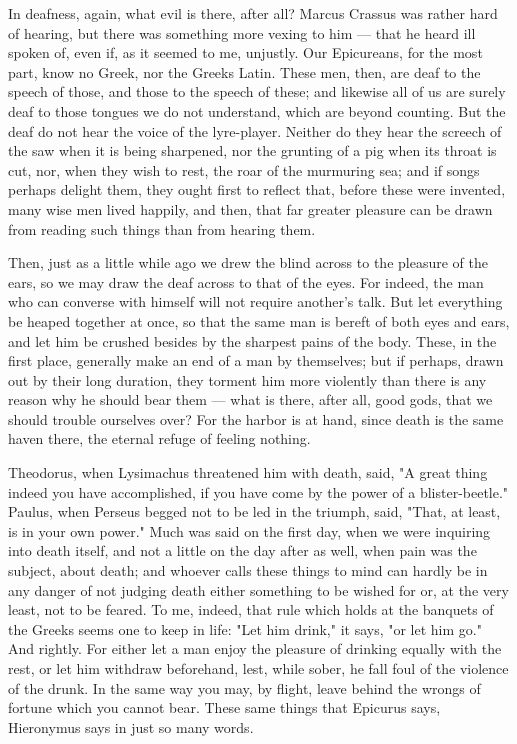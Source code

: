  In deafness, again, what evil is there, after all? Marcus Crassus was rather hard of hearing, but there was something more vexing to him — that he heard ill spoken of, even if, as it seemed to me, unjustly. Our Epicureans, for the most part, know no Greek, nor the Greeks Latin. These men, then, are deaf to the speech of those, and those to the speech of these; and likewise all of us are surely deaf to those tongues we do not understand, which are beyond counting. But the deaf do not hear the voice of the lyre-player. Neither do they hear the screech of the saw when it is being sharpened, nor the grunting of a pig when its throat is cut, nor, when they wish to rest, the roar of the murmuring sea; and if songs perhaps delight them, they ought first to reflect that, before these were invented, many wise men lived happily, and then, that far greater pleasure can be drawn from reading such things than from hearing them.

 Then, just as a little while ago we drew the blind across to the pleasure of the ears, so we may draw the deaf across to that of the eyes. For indeed, the man who can converse with himself will not require another's talk. But let everything be heaped together at once, so that the same man is bereft of both eyes and ears, and let him be crushed besides by the sharpest pains of the body. These, in the first place, generally make an end of a man by themselves; but if perhaps, drawn out by their long duration, they torment him more violently than there is any reason why he should bear them — what is there, after all, good gods, that we should trouble ourselves over? For the harbor is at hand, since death is the same haven there, the eternal refuge of feeling nothing.

 Theodorus, when Lysimachus threatened him with death, said, "A great thing indeed you have accomplished, if you have come by the power of a blister-beetle." Paulus, when Perseus begged not to be led in the triumph, said, "That, at least, is in your own power." Much was said on the first day, when we were inquiring into death itself, and not a little on the day after as well, when pain was the subject, about death; and whoever calls these things to mind can hardly be in any danger of not judging death either something to be wished for or, at the very least, not to be feared. To me, indeed, that rule which holds at the banquets of the Greeks seems one to keep in life: "Let him drink," it says, "or let him go." And rightly. For either let a man enjoy the pleasure of drinking equally with the rest, or let him withdraw beforehand, lest, while sober, he fall foul of the violence of the drunk. In the same way you may, by flight, leave behind the wrongs of fortune which you cannot bear. These same things that Epicurus says, Hieronymus says in just so many words.

